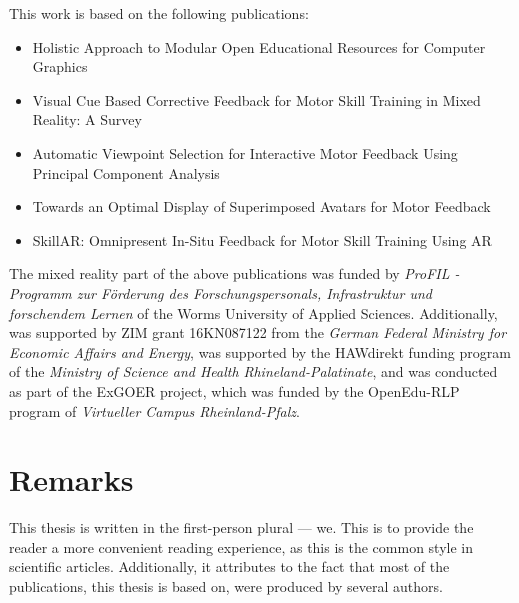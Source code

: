 This work is based on the following publications:
\begin{itemize}
	\setlength{\itemsep}{-0.3cm}
	\item Holistic Approach to Modular Open Educational Resources for Computer Graphics \cite{diller2024holistic}
	\item Visual Cue Based Corrective Feedback for Motor Skill Training in Mixed Reality: A Survey \cite{diller2022vcb}
	\item Automatic Viewpoint Selection for Interactive Motor Feedback Using Principal Component Analysis \cite{diller2024automatic}
	\item Towards an Optimal Display of Superimposed Avatars for Motor Feedback \cite{diller2025towards}
	\item SkillAR: Omnipresent In-Situ Feedback for Motor Skill Training Using AR \cite{diller2025skillar}
\end{itemize}


The mixed reality part of the above publications was funded by \emph{ProFIL - Programm zur Förderung des Forschungspersonals, Infrastruktur und forschendem Lernen} of the Worms University of Applied Sciences. Additionally, \cite{diller2024automatic} was supported by ZIM grant 16KN087122 from the \emph{German Federal Ministry for Economic Affairs and Energy}, \cite{diller2024skillar} was supported by the HAWdirekt funding program of the \emph{Ministry of Science and Health Rhineland-Palatinate}, and \cite{diller2024holistic} was conducted as part of the ExGOER project, which was funded by the OpenEdu-RLP program of \emph{Virtueller Campus Rheinland-Pfalz}.

\section{Remarks}

This thesis is written in the first-person plural --- we. This is to provide the reader a more convenient reading experience, as this is the common style in scientific articles. Additionally, it attributes to the fact that most of the publications, this thesis is based on, were produced by several authors.